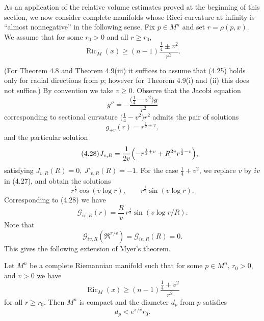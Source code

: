 As an application of the relative volume estimates proved at the beginning of
this section, we now consider complete manifolds whose Ricci curvature at
infinity is ``almost nonnegative'' in the following sense. Fix \(p\in M^n\) and
set \(r=\rho(p,x)\). We assume that for some \(r_0>0\) and all \(r\ge r_0\),
\begin{equation}\tag{4.25}
\operatorname{Ric}_M(x)\ge (n-1)\frac{\frac14\pm v^2}{r^2}.
\end{equation}

(For Theorem 4.8 and Theorem 4.9(iii) it suffices to assume that (4.25) holds
only for radial directions from \(p\); however for Theorem 4.9(i) and (ii) this
does not suffice.) By convention we take $v\ge 0$. Observe that the Jacobi
equation
\begin{equation}\tag{4.26}
g''=-\frac{\bigl(\frac14-v^2\bigr)g}{r^2}
\end{equation}
corresponding to sectional curvature \(\bigl(\frac14-v^2\bigr)r^2\) admits the
pair of solutions
\begin{equation}\tag{4.27}
g_{\pm v}(r)=r^{\frac12\pm v},
\end{equation}
and the particular solution
\begin{equation}\tag{4.28}
J_{v,R}=\frac{1}{2v}\Bigl(-r^{\frac12+v}+R^{2v}r^{\frac12-v}\Bigr),
\end{equation}
satisfying \(J_{v,R}(R)=0,\ J'_{v,R}(R)=-1\). For the case
\(\frac14+v^2\), we replace $v$ by $iv$ in (4.27), and obtain the solutions
\begin{equation}\tag{4.29}
r^{\frac12}\cos(v\log r),\qquad r^{\frac12}\sin(v\log r).
\end{equation}
Corresponding to (4.28) we have
\begin{equation}\tag{4.30}
\mathcal G_{iv,R}(r)=\frac{R}{v}\,r^{\frac12}\sin(v\log r/R).
\end{equation}
Note that
\begin{equation}\tag{4.31}
\mathcal G_{iv,R}(\Re^{\pi/v})=\mathcal G_{iv,R}(R)=0.
\end{equation}
This gives the following extension of Myer's theorem.

\begin{theorem}
\label{thm:asymptotic-ricci-compactness}

Let \(M^n\) be a complete Riemannian manifold such that for some
$p\in M^n,\, r_0>0,$ and $v>0$ we have
\begin{equation}\tag{4.32}
\operatorname{Ric}_M(x)\ge (n-1)\frac{\frac14+v^2}{r^2}
\end{equation}
for all \(r\ge r_0\). Then \(M^n\) is compact and the diameter $d_p$ from $p$
satisfies
\begin{equation}\tag{4.33}
d_p<e^{\pi/v}r_0.
\end{equation}
\end{theorem}

